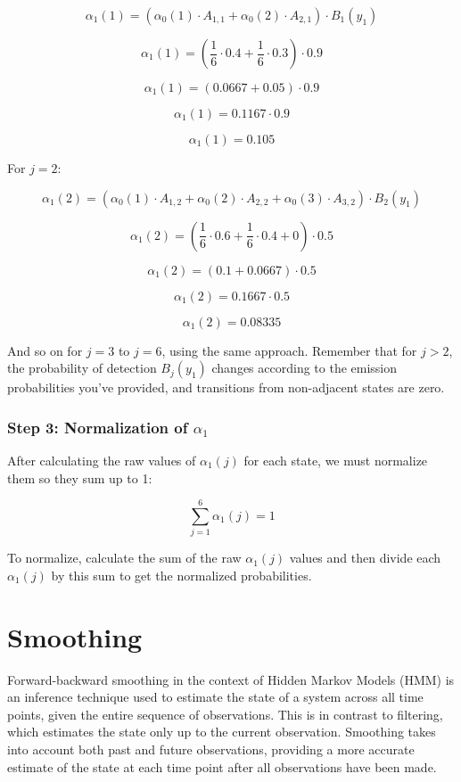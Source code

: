 \documentclass[10pt]{article}
\begin{document}
\[ \alpha_1(1) = \left( \alpha_0(1) \cdot A_{1,1} + \alpha_0(2) \cdot A_{2,1} \right) \cdot B_1(y_1) \]

\[ \alpha_1(1) = \left( \frac{1}{6} \cdot 0.4 + \frac{1}{6} \cdot 0.3 \right) \cdot 0.9 \]

\[ \alpha_1(1) = \left( 0.0667 + 0.05 \right) \cdot 0.9 \]

\[ \alpha_1(1) = 0.1167 \cdot 0.9 \]

\[ \alpha_1(1) = 0.105 \]

For \( j = 2 \):

\[ \alpha_1(2) = \left( \alpha_0(1) \cdot A_{1,2} + \alpha_0(2) \cdot A_{2,2} + \alpha_0(3) \cdot A_{3,2} \right) \cdot B_2(y_1) \]

\[ \alpha_1(2) = \left( \frac{1}{6} \cdot 0.6 + \frac{1}{6} \cdot 0.4 + 0 \right) \cdot 0.5 \]

\[ \alpha_1(2) = \left( 0.1 + 0.0667 \right) \cdot 0.5 \]

\[ \alpha_1(2) = 0.1667 \cdot 0.5 \]

\[ \alpha_1(2) = 0.08335 \]

And so on for \( j = 3 \) to \( j = 6 \), using the same approach. Remember that for \( j > 2 \), the probability of detection \( B_j(y_1) \) changes according to the emission probabilities you've provided, and transitions from non-adjacent states are zero.

\subsubsection*{Step 3: Normalization of \( \alpha_1 \)}
After calculating the raw values of \( \alpha_1(j) \) for each state, we must normalize them so they sum up to 1:

\[ \sum_{j=1}^{6} \alpha_1(j) = 1 \]

To normalize, calculate the sum of the raw \( \alpha_1(j) \) values and then divide each \( \alpha_1(j) \) by this sum to get the normalized probabilities.

\section{Smoothing}

Forward-backward smoothing in the context of Hidden Markov Models (HMM) is an inference technique used to estimate the state of a system across all time points, given the entire sequence of observations. This is in contrast to filtering, which estimates the state only up to the current observation. Smoothing takes into account both past and future observations, providing a more accurate estimate of the state at each time point after all observations have been made.
\end{document}

